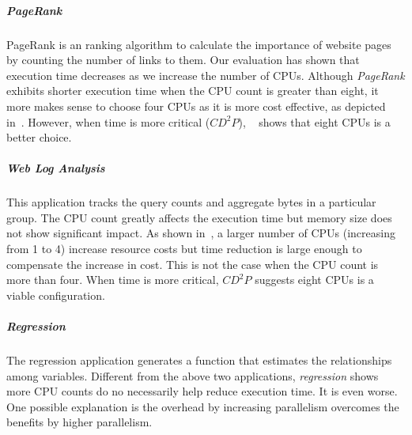 \subparagraph*{PageRank}

PageRank is an ranking algorithm to calculate the importance of website pages
by counting the number of links to them.
Our evaluation has shown that execution time decreases as
we increase the number of CPUs.
Although \emph{PageRank} exhibits shorter execution time
when the CPU count is greater than eight,
it more makes sense to choose four CPUs as it is more cost effective,
as depicted in~\myfigure{\ref{fig:pagerank_cost}}.
However, when time is more critical ($CD^2P$),
~\myfigure{\ref{fig:pagerank_time}} shows that
eight CPUs is a better choice.

\subparagraph*{Web Log Analysis}
This application tracks the query counts and aggregate bytes in a particular group.
The CPU count greatly affects the execution time but memory size does not
show significant impact.
As shown in~\myfigure{\ref{fig:webloganalysis_time}}, a larger number of CPUs (increasing from 1 to 4)
increase resource costs but time reduction is large enough
to compensate the increase in cost.
This is not the case when the CPU count is more than four.
When time is more critical, $CD^2P$ suggests eight CPUs is a viable configuration.

\subparagraph*{Regression}
The regression application generates a function that estimates 
the relationships among variables.
Different from the above two applications, \emph{regression} shows
more CPU counts do no necessarily help reduce execution time.
It is even worse.
One possible explanation is the overhead by increasing parallelism overcomes
the benefits by higher parallelism.


